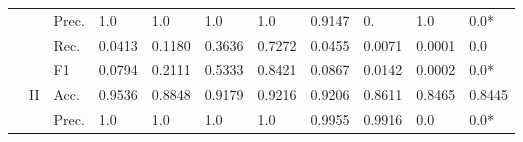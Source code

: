 \begin{tabular}{cclllllllll}
    \multicolumn{1}{l}{}                                                                                       &                                   & Prec.                                                & 1.0                     & 1.0                     & 1.0                          & 1.0                     & 0.9147                                                                       & 0.                                                                          & 1.0                                       & 0.0*                                      \\
    \multicolumn{1}{l}{}                                                                                       &                                   & Rec.                                                 & 0.0413                  & 0.1180                  & 0.3636                       & 0.7272                  & 0.0455                                                                       & 0.0071                                                                      & 0.0001                                    & 0.0                                       \\
    \multicolumn{1}{l}{}                                                                                       &                                   & F1                                                   & 0.0794                  & 0.2111                  & 0.5333                       & 0.8421                  & 0.0867                                                                       & 0.0142                                                                      & 0.0002                                    & 0.0*                                      \\ 
    \cmidrule{2-11}
    \multicolumn{1}{l}{}                                                                                       & \multirow{4}{*}{II}               & Acc.                                                 & 0.9536                  & 0.8848                  & 0.9179                       & 0.9216                  & 0.9206                                                                       & 0.8611                                                                      & 0.8465                                    & 0.8445                                    \\
    \multicolumn{1}{l}{}                                                                                       &                                   & Prec.                                                & 1.0                     & 1.0                     & 1.0                          & 1.0                     & 0.9955                                                                       & 0.9916                                                                      & 0.0                                       & 0.0*                                      \\

\end{tabular}
